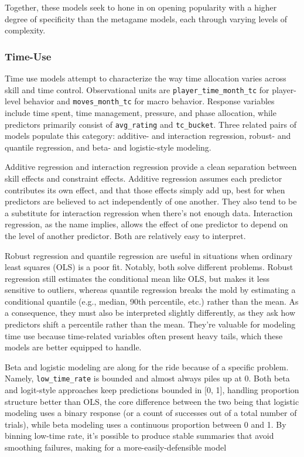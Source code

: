 \documentclass[
  12pt]{article}
\begin{document}
Together, these models seek to hone in on opening popularity with a
higher degree of specificity than the metagame models, each through
varying levels of complexity.

\subsubsection{Time-Use}\label{time-use}

Time use models attempt to characterize the way time allocation varies
across skill and time control. Observational units are
\texttt{player\_time\_month\_tc} for player-level behavior and
\texttt{moves\_month\_tc} for macro behavior. Response variables include
time spent, time management, pressure, and phase allocation, while
predictors primarily consist of \texttt{avg\_rating} and
\texttt{tc\_bucket}. Three related pairs of models populate this
category: additive- and interaction regression, robust- and quantile
regression, and beta- and logistic-style modeling.

Additive regression and interaction regression provide a clean
separation between skill effects and constraint effects. Additive
regression assumes each predictor contributes its own effect, and that
those effects simply add up, best for when predictors are believed to
act independently of one another. They also tend to be a substitute for
interaction regression when there's not enough data. Interaction
regression, as the name implies, allows the effect of one predictor to
depend on the level of another predictor. Both are relatively easy to
interpret.

Robust regression and quantile regression are useful in situations when
ordinary least squares (OLS) is a poor fit. Notably, both solve
different problems. Robust regression still estimates the conditional
mean like OLS, but makes it less sensitive to outliers, whereas quantile
regression breaks the mold by estimating a conditional quantile (e.g.,
median, 90th percentile, etc.) rather than the mean. As a consequence,
they must also be interpreted slightly differently, as they ask how
predictors shift a percentile rather than the mean. They're valuable for
modeling time use because time-related variables often present heavy
tails, which these models are better equipped to handle.

Beta and logistic modeling are along for the ride because of a specific
problem. Namely, \texttt{low\_time\_rate} is bounded and almost always
piles up at 0. Both beta and logit-style approaches keep predictions
bounded in {[}0, 1{]}, handling proportion structure better than OLS,
the core difference between the two being that logistic modeling uses a
binary response (or a count of successes out of a total number of
trials), while beta modeling uses a continuous proportion between 0 and
1. By binning low-time rate, it's possible to produce stable summaries
that avoid smoothing failures, making for a more-easily-defensible model
\end{document}
